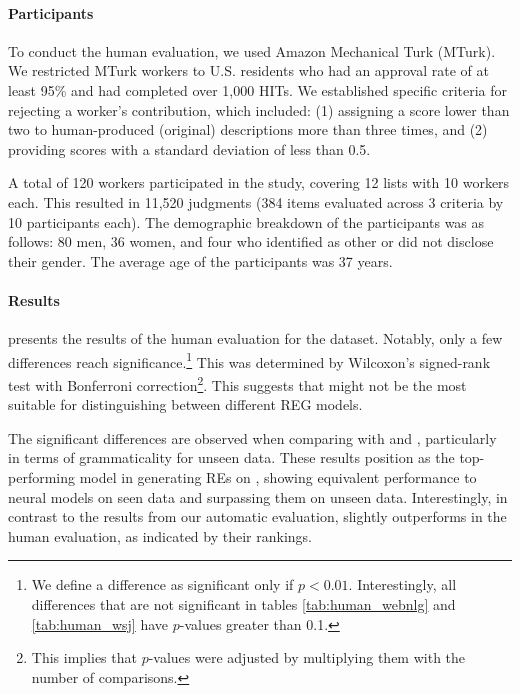 


\paragraph*{Participants} 

To conduct the human evaluation, we used Amazon Mechanical Turk (MTurk). We restricted MTurk workers to U.S. residents who had an approval rate of at least 95\% and had completed over 1,000 HITs. We established specific criteria for rejecting a worker's contribution, which included: (1) assigning a score lower than two to human-produced (original) descriptions more than three times, and (2) providing scores with a standard deviation of less than 0.5.

A total of 120 workers participated in the study, covering 12 lists with 10 workers each. This resulted in 11,520 judgments (384 items evaluated across 3 criteria by 10 participants each). The demographic breakdown of the participants was as follows: 80 men, 36 women, and four who identified as other or did not disclose their gender. The average age of the participants was 37 years.

\paragraph*{Results} 

 presents the results of the human evaluation for the \webnlg dataset. Notably, only a few differences reach significance.\footnote{We define a difference as significant only if $p < 0.01$. Interestingly, all differences that are not significant in tables \ref{tab:human_webnlg} and \ref{tab:human_wsj} have $p$-values greater than 0.1.} This was determined by Wilcoxon's signed-rank test with Bonferroni correction\footnote{This implies that $p$-values were adjusted by multiplying them with the number of comparisons.}. This suggests that \webnlg might not be the most suitable for distinguishing between different REG models. 

The significant differences are observed when comparing  with   and , particularly in terms of grammaticality for unseen data. These results position  as the top-performing model in generating REs on \webnlg, showing equivalent performance to neural models on seen data and surpassing them on unseen data. Interestingly, in contrast to the results from our automatic evaluation,  slightly outperforms  in the human evaluation, as indicated by their rankings.

